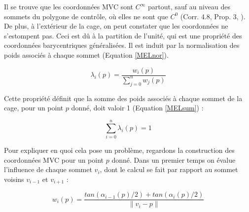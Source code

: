 Il se trouve que les coordonnées MVC sont $C^\infty$ partout, sauf au
niveau des sommets du polygone de contrôle, où elles ne sont que $C^0$
(Corr. 4.8, Prop. 3, \cite{HF06}). De plus, à l'extérieur de la cage,
on peut constater que les coordonnées ne s'estompent pas. Ceci est dû
à la partition de l'unité, qui est une propriété des coordonnées
barycentriques généralisées. Il est induit par la normalisation des
poids associés à chaque sommet (Equation \ref{MELnor}).

\begin{equation}
  \lambda_i(p) = \frac{w_i(p)}{\sum_{j=0}^n w_j(p)}
  \label{MELnor}
\end{equation}

Cette propriété définit que la somme des poids associés à chaque
sommet de la cage, pour un point $p$ donné, doit valoir 1 (Equation
\ref{MELsum}) :

\begin{equation}
  \sum_{i=0}^n \lambda_i(p) = 1
  \label{MELsum}
\end{equation}

Pour expliquer en quoi cela pose un problème, regardons la
construction des coordonnées MVC pour un point $p$ donné. Dans un
premier temps on évalue l'influence de chaque sommet $v_i$, dont le
calcul se fait par rapport au sommet voisins $v_{i-1}$ et $v_{i+1}$ :

\begin{equation}
  w_i(p) = \frac{tan(\alpha_{i-1}(p)/2) + tan(\alpha_{i}(p)/2)}{\|v_i - p\|}
\end{equation}



